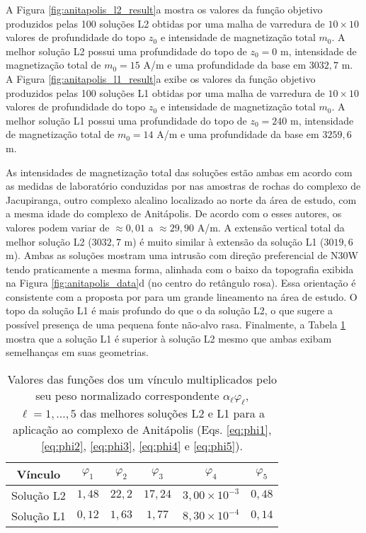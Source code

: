 A Figura \ref{fig:anitapolis_l2_result}a mostra os valores da função objetivo produzidos pelas 100 soluções L2 obtidas por uma malha de varredura de $10 \times 10$ valores de profundidade do topo $z_{0}$ e intensidade de magnetização total $m_{0}$.
A melhor solução L2 possui uma profundidade do topo de $z_{0} = 0$ m, intensidade de magnetização total de $m_{0} = 15$ A/m e uma profundidade da base em $3032,7$ m.
A Figura \ref{fig:anitapolis_l1_result}a exibe os valores da função objetivo produzidos pelas 100 soluções L1 obtidas por uma malha de varredura de $10 \times 10$ valores de profundidade do topo $z_{0}$ e intensidade de magnetização total $m_{0}$.
A melhor solução L1 possui uma profundidade do topo de $z_{0} = 240$ m, intensidade de magnetização total de $m_{0} = 14$ A/m e uma profundidade da base em $3259,6$ m.

As intensidades de magnetização total das soluções estão ambas em acordo com as medidas de laboratório conduzidas por \citet{valdivia_etal2009} nas amostras de rochas do complexo de Jacupiranga, outro complexo alcalino localizado ao norte da área de estudo, com a mesma idade do complexo de Anitápolis. De acordo com o esses autores,
os valores podem variar de $\approx 0,01$ a $\approx 29,90$ A/m.
A extensão vertical total da melhor solução L2 ($3032,7$ m) é muito similar à extensão da solução L1 ($3019,6$ m). 
Ambas as soluções mostram uma intrusão com direção preferencial de N30W tendo praticamente a mesma forma,
alinhada com o baixo da topografia exibida na Figura \ref{fig:anitapolis_data}d (no centro do retângulo rosa). 
Essa orientação é consistente com a proposta por \citet{horbach_marimon1980} para um grande lineamento na área de estudo.
O topo da solução L1 é mais profundo do que o da solução L2, 
o que sugere a possível presença de uma pequena fonte não-alvo rasa.
Finalmente, a Tabela \ref{tab:anitapolis} mostra que a solução L1 é superior à solução L2 mesmo que ambas exibam semelhanças em suas geometrias.

\begin{table}[h]\label{tab:anitapolis}
	\caption{Valores das funções dos um vínculo multiplicados pelo seu peso normalizado correspondente $ \alpha_\ell \varphi_\ell  $, $ \ell=1,\dots,5 $ das melhores soluções L2 e L1 para a aplicação ao complexo de Anitápolis (Eqs. \ref{eq:phi1}, \ref{eq:phi2}, \ref{eq:phi3}, \ref{eq:phi4} e \ref{eq:phi5}).}
	\centering
	\vspace{0.5cm}
	\begin{tabular}{c|ccccc}
		Vínculo & $ \varphi _1 $ & $ \varphi _2 $ &  $ \varphi _3 $ &  $ \varphi _4 $ &  $ \varphi _5 $ \\
		\hline
		Solução L2 & $ 1,48 $ & $ 22,2 $ & $ 17,24 $ & $3,00\times 10^{-3} $ & $ 0,48 $ \\ 
		Solução L1 & $ 0,12 $ & $ 1,63 $ & $ 1,77 $ & $8,30\times 10^{-4} $ & $ 0,14 $
	\end{tabular}
\end{table}

